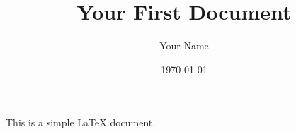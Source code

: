 \documentclass{article}
\begin{document}
\title{Your First Document}
\author{Your Name}
\date{\today}

\maketitle

This is a simple LaTeX document.
\end{document}

